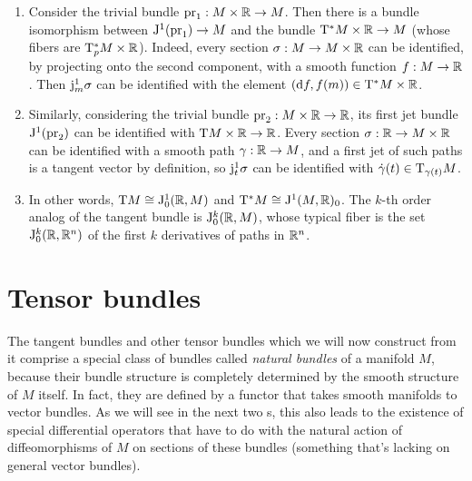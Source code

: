\begin{example}
    \begin{enumerate}
        \item Consider the trivial bundle $\operatorname{pr}_1:M\times\mathbb{R}\to M$. Then there is a bundle isomorphism between $\mathrm{J}^1(\operatorname{pr}_1)\to M$ and the bundle $\mathrm{T}^\ast M\times \mathbb{R}\to M$ (whose fibers are $\mathrm{T}^\ast_pM\times\mathbb{R}$). Indeed, every section $\sigma:M\to M\times\mathbb{R}$ can be identified, by projecting onto the second component, with a smooth function $f:M\to \mathbb{R}$. Then $\mathrm{j}^1_m\sigma$ can be identified with the element $({\mathrm{d}} f,f(m))\in \mathrm{T}^\ast M\times \mathbb{R}$.
        
        \item Similarly, considering the trivial bundle $\operatorname{pr}_2:M\times \mathbb{R}\to \mathbb{R}$, its first jet bundle $\mathrm{J}^1(\operatorname{pr}_2)$ can be identified with $\mathrm{T} M\times \mathbb{R}\to \mathbb{R}$. Every section $\sigma:\mathbb{R}\to M\times\mathbb{R}$ can be identified with a smooth path $\gamma:\mathbb{R}\to M$, and a first jet of such paths is a tangent vector by definition, so $\mathrm{j}^1_t\sigma$ can be identified with $\dot\gamma(t)\in \mathrm{T}_{\gamma(t)}M$.

        \item In other words, $\mathrm{T} M\cong \mathrm{J}^1_0(\mathbb{R},M)$ and $\mathrm{T}^\ast M\cong \mathrm{J}^1(M,\mathbb{R})_0$. The $k$-th order analog of the tangent bundle is $\mathrm{J}^k_0(\mathbb{R},M)$, whose typical fiber is the set $\mathrm{J}_0^k(\mathbb{R},\mathbb{R}^n)$ of the first $k$ derivatives of paths in $\mathbb{R}^n$.
    \end{enumerate}
\end{example}







\section{Tensor bundles}


The tangent bundles and other tensor bundles which we will now construct from it comprise a special class of bundles called \emph{natural bundles} of a manifold $M$, because their bundle structure is completely determined by the smooth structure of $M$ itself. In fact, they are defined by a functor that takes smooth manifolds to vector bundles. As we will see in the next two \sect s, this also leads to the existence of special differential operators that have to do with the natural action of diffeomorphisms of $M$ on sections of these bundles (something that's lacking on general vector bundles).


